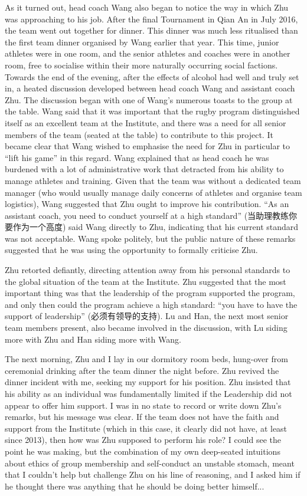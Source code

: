 \begin{CJK}{UTF8}{gbsn}
As it turned out, head coach Wang also began to notice the way in which Zhu was approaching to his job.  After the final Tournament in Qian An in July 2016, the team went out together for dinner.  This dinner was much less ritualised than the first team dinner organised by Wang earlier that year.  This time,  junior athletes were in one room, and the senior athletes and coaches were in another room, free to socialise within their more naturally occurring social factions.  Towards the end of the evening, after the effects of alcohol had well and truly set in, a heated discussion developed between head coach Wang and assistant coach Zhu. The discussion began with one of Wang's numerous toasts to the group at the table.  Wang said that it was important that the rugby program distinguished itself as an excellent team at the Institute, and there was a need for all senior members of the team (seated at the table) to contribute to this project.  It became clear that Wang wished to emphasise the need for Zhu in particular to ``lift his game'' in this regard. Wang explained that as head coach he was burdened with a lot of administrative work that detracted from his ability to manage athletes and training.  Given that the team was without a dedicated team manager (who would usually manage daily concerns of athletes and organise team logistics), Wang suggested that Zhu ought to improve his contribution. ``As an assistant coach, you need to conduct yourself at a high standard'' (当助理教练你要作为一个高度) said Wang directly to Zhu, indicating that his current standard was not acceptable. Wang spoke politely, but the public nature of these remarks suggested that he was using the opportunity to formally criticise Zhu.

Zhu retorted defiantly, directing attention away from his personal standards to the global situation of the team at the Institute.  Zhu suggested that the most important thing was that the leadership of the program supported the program, and only then could the program achieve a high standard: ``you have to have the support of leadership'' (必须有领导的支持).  Lu and Han, the next most senior team members present, also became involved in the discussion, with Lu siding more with Zhu and Han siding more with Wang.

The next morning, Zhu and I lay in our dormitory room beds, hung-over from ceremonial drinking after the team dinner the night before.  Zhu revived the dinner incident with me, seeking my support for his position.  Zhu insisted that his ability as an individual was fundamentally limited if the Leadership did not appear to offer him support.  I was in no state to record or write down Zhu's remarks, but his message was clear. If the team does not have the faith and support from the Institute (which in this case, it clearly did not have, at least since 2013), then how was Zhu supposed to perform his role?   I could see the point he was making, but the combination of my own deep-seated intuitions about ethics of group membership and self-conduct an unstable stomach, meant that I couldn't help but challenge Zhu on his line of reasoning, and I asked him if he thought there was anything that he should be doing better himself...


\end{CJK}
